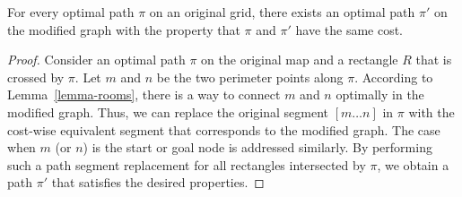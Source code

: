\begin{theorem}
For every optimal path $\pi$ on an original grid, there exists an optimal path
$\pi'$ on the modified graph with the property that $\pi$ and $\pi'$ have the
same cost.
\end{theorem}
\begin{proof}
Consider an optimal path $\pi$ on the original map and a rectangle $R$ that is
crossed by $\pi$.  Let $m$ and $n$ be the two perimeter points along $\pi$.
According to Lemma~\ref{lemma-rooms}, there is a way to connect $m$ and $n$
optimally in the modified graph. Thus, we can replace the original segment $[m
\dots n]$ in $\pi$ with the cost-wise equivalent segment that corresponds to the
modified graph.  The case when $m$ (or $n$) is the start or goal node is
addressed similarly.  By performing such a
path segment replacement for all rectangles intersected by $\pi$, we obtain a
path $\pi'$ that satisfies the desired properties.
\end{proof}


